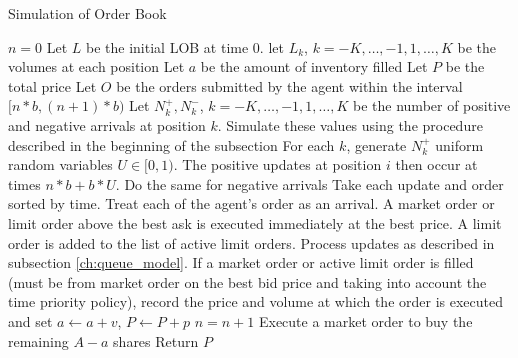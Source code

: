 \begin{algorithm}[H]
\SetAlgoLined
\caption{Simulation of Order Book}
 $n = 0$\;
 Let $L$ be the initial LOB at time $0$. let $L_k$, $k = -K, \ldots, -1, 1, \ldots, K$ be the volumes at each position \;
 Let $a$ be the amount of inventory filled \;
 Let $P$ be the total price \;
  {
 Let $O$ be the orders submitted by the agent within the interval $[n*b, (n+1)*b)$ \;
 Let $N^+_k, N^-_k$, $k = -K, \ldots, -1, 1, \ldots, K$ be the number of positive and negative arrivals at position $k$. Simulate these values using the procedure described in the beginning of the subsection \;
 For each $k$, generate $N^+_k$ uniform random variables $U \in [0,1)$. The positive updates at position $i$ then occur at times $n*b + b*U$. Do the same for negative arrivals \;
 Take each update and order sorted by time. Treat each of the agent's order as an arrival. A market order or limit order above the best ask is executed immediately at the best price. A limit order is added to the list of active limit orders. Process updates as described in subsection \ref{ch:queue_model}. If a market order or active limit order is filled (must be from market order on the best bid price and taking into account the time priority policy), record the price and volume at which the order is executed and set $a \leftarrow a + v$, $P \leftarrow P + p$ \;
 $ n = n + 1$ \;
 }
 Execute a market order to buy the remaining $A-a$ shares \;
 Return $P$ \;
\end{algorithm}

